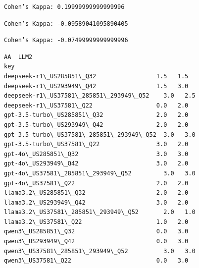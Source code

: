 \documentclass[11pt]{article}
\makeatletter
\newcommand{\boxspacing}{\kern\kvtcb@left@rule\kern\kvtcb@boxsep}
\newcommand{\prompt}[4]{
        {\ttfamily\llap{{\color{#2}[#3]:\hspace{3pt}#4}}\vspace{-\baselineskip}}
    }
\makeatother
\begin{document}
    
    
    
    
    
    
    
    
    
    
    
    
    
    \begin{Verbatim}[commandchars=\\\{\}]
Cohen’s Kappa: 0.19999999999999996
    \end{Verbatim}

    \begin{Verbatim}[commandchars=\\\{\}]
Cohen’s Kappa: -0.09589041095890405
    \end{Verbatim}

    \begin{Verbatim}[commandchars=\\\{\}]
Cohen’s Kappa: -0.07499999999999996
    \end{Verbatim}

            \begin{tcolorbox}[breakable, size=fbox, boxrule=.5pt, pad at break*=1mm, opacityfill=0]
\prompt{Out}{outcolor}{88}{\boxspacing}
\begin{Verbatim}[commandchars=\\\{\}]
                                          AA  LLM2
key
deepseek-r1\_US285851\_Q32                 1.5   1.5
deepseek-r1\_US293949\_Q42                 1.5   3.0
deepseek-r1\_US37581\_285851\_293949\_Q52    3.0   2.5
deepseek-r1\_US37581\_Q22                  0.0   2.0
gpt-3.5-turbo\_US285851\_Q32               2.0   2.0
gpt-3.5-turbo\_US293949\_Q42               2.0   2.0
gpt-3.5-turbo\_US37581\_285851\_293949\_Q52  3.0   3.0
gpt-3.5-turbo\_US37581\_Q22                3.0   2.0
gpt-4o\_US285851\_Q32                      3.0   3.0
gpt-4o\_US293949\_Q42                      3.0   2.0
gpt-4o\_US37581\_285851\_293949\_Q52         3.0   3.0
gpt-4o\_US37581\_Q22                       2.0   2.0
llama3.2\_US285851\_Q32                    2.0   2.0
llama3.2\_US293949\_Q42                    3.0   2.0
llama3.2\_US37581\_285851\_293949\_Q52       2.0   1.0
llama3.2\_US37581\_Q22                     1.0   2.0
qwen3\_US285851\_Q32                       0.0   3.0
qwen3\_US293949\_Q42                       0.0   3.0
qwen3\_US37581\_285851\_293949\_Q52          3.0   3.0
qwen3\_US37581\_Q22                        0.0   3.0
\end{Verbatim}
\end{tcolorbox}
        
\end{document}
